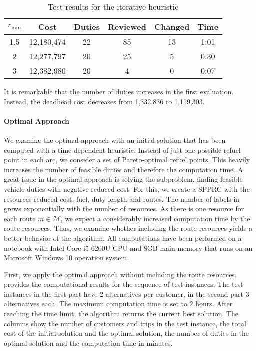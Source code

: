 \begin{table}[htb]
	\centering
	\begin{tabular}{cccccc}
		\toprule
		$r_{\min}$ & Cost & Duties & Reviewed & Changed & Time \\
		\midrule
		1.5 & 12,180,474 & 22 & 85 & 13 & 1:01 \\
		2   & 12,277,797 & 20 & 25 & 5  & 0:30 \\
		3   & 12,382,980 & 20 & 4  & 0  & 0:07 \\
		\bottomrule
	\end{tabular}
	\caption{Test results for the iterative heuristic}
	\label{tab:results:iterative}
\end{table}

It is remarkable that the number of duties increases in the first evaluation. Instead, the deadhead cost decreases from 1,332,836 to 1,119,303.

\paragraph{Optimal Approach} \parfill

We examine the optimal approach with an initial solution that has been computed with a time-dependent heuristic. Instead of just one possible refuel point in each arc, we consider a set of Pareto-optimal refuel points. This heavily increases the number of feasible duties and therefore the computation time. A great issue in the optimal approach is solving the subproblem, \ie finding feasible vehicle duties with negative reduced cost. For this, we create a SPPRC with the resources reduced cost, fuel, duty length and routes. The number of labels in  grows exponentially with the number of resources. As there is one resource for each route ${m\in\mathcal{M}}$, we expect a considerably increased computation time by the route resources. Thus, we examine whether including the route resources yields a better behavior of the algorithm. All computations have been performed on a notebook with Intel Core i5-6200U CPU and 8GB main memory that runs on an Microsoft Windows 10 operation system.

First, we apply the optimal approach without including the route resources.  provides the computational results for the sequence of test instances. The test instances in the first part have 2 alternatives per customer, in the second part 3 alternatives each. The maximum computation time is set to 2 hours. After reaching the time limit, the algorithm returns the current best solution. The columns show the number of customers and trips in the test instance, the total cost of the initial solution and the optimal solution, the number of duties in the optimal solution and the computation time in minutes.


